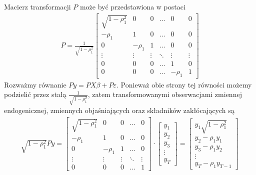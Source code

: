 Macierz transformacji $ P $ może być przedstawiona w postaci
\begin{gather*}
P=
\frac{1}{\sqrt{1-\rho_1^2}}
\begin{bmatrix}
	\sqrt{1-\rho_1^2} & 0        & 0      & \ldots & 0        & 0      \\
	-\rho _1          & 1        & 0      & \ldots & 0        & 0      \\
	0                 & -\rho _1 & 1      & \ldots & 0        & 0      \\
	\vdots            & \vdots   & \vdots & \ddots & \vdots   & \vdots \\
	0                 & 0        & 0      & \ldots & 1        & 0      \\
	0                 & 0        & 0      & \ldots & -\rho _1 & 1
\end{bmatrix}
\end{gather*}
Rozważmy równanie $ Py=PX\beta +P\varepsilon $. Ponieważ obie strony tej równości możemy podzielić przez stałą $ \frac{1}{\sqrt{1-\rho_1^2}} $, zatem transformowanymi obserwacjami zmiennej endogenicznej, zmiennych objaśniających oraz składników zakłócających są
\begin{gather*}
\sqrt{1-\rho_1^2}Py=
\begin{bmatrix}
	\sqrt{1-\rho_1^2} & 0        & 0      & \ldots & 0      \\
	-\rho _1          & 1        & 0      & \ldots & 0      \\
	0                 & -\rho _1 & 1      & \ldots & 0      \\
	\vdots            & \vdots   & \vdots & \ddots & \vdots \\
	0                 & 0        & 0      & \ldots & 1
\end{bmatrix}
\cdot
\begin{bmatrix}
	y_1    \\
	y_2    \\
	y_3    \\
	\vdots \\
	y_T
\end{bmatrix}
=
\begin{bmatrix}
	y_1 \sqrt{1-\rho _1^2} \\
	y_2-\rho _1 y_1        \\
	y_3-\rho _1 y_2        \\
	\vdots                 \\
	y_T-\rho _1 y_{T-1}
\end{bmatrix}
\end{gather*}
